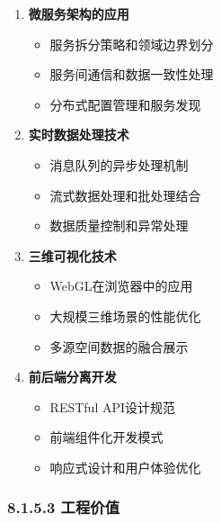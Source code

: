 \begin{enumerate}
\def\labelenumi{\arabic{enumi}.}
\tightlist
\item
  \textbf{微服务架构的应用}

  \begin{itemize}
  \tightlist
  \item
    服务拆分策略和领域边界划分
  \item
    服务间通信和数据一致性处理
  \item
    分布式配置管理和服务发现
  \end{itemize}
\item
  \textbf{实时数据处理技术}

  \begin{itemize}
  \tightlist
  \item
    消息队列的异步处理机制
  \item
    流式数据处理和批处理结合
  \item
    数据质量控制和异常处理
  \end{itemize}
\item
  \textbf{三维可视化技术}

  \begin{itemize}
  \tightlist
  \item
    WebGL在浏览器中的应用
  \item
    大规模三维场景的性能优化
  \item
    多源空间数据的融合展示
  \end{itemize}
\item
  \textbf{前后端分离开发}

  \begin{itemize}
  \tightlist
  \item
    RESTful API设计规范
  \item
    前端组件化开发模式
  \item
    响应式设计和用户体验优化
  \end{itemize}
\end{enumerate}

\subsubsection{8.1.5.3 工程价值}\label{ux5de5ux7a0bux4ef7ux503c}

